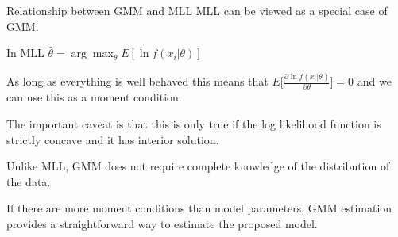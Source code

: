 \documentclass[handout]{beamer}
\begin{document}
\begin{frame}{Relationship between GMM and MLL}
MLL can be viewed as a special case of GMM.\bigskip

In MLL
$ \hat{\theta}=\arg\max_\theta E[\ln f(x_i|\theta)]$\medskip

As long as everything is well behaved this means that
$\displaystyle E\Big[\frac{\partial \ln f(x_i|\theta)}{\partial \theta} \Big]=0$
 and we can use this as a moment condition.\medskip

The important caveat is that this is only true if the log likelihood function is strictly concave and it has interior solution.\bigskip

Unlike MLL, GMM does not require complete knowledge of the distribution of the data.\medskip

If there are more moment conditions than model parameters, GMM estimation provides a straightforward way to estimate the proposed model. 
\end{frame}


%
%
\end{document}
